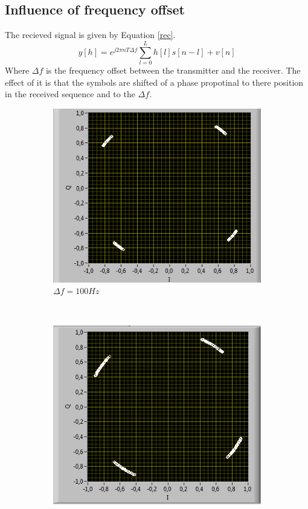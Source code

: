 \documentclass{article}
\begin{document}
	\subsection{Influence of frequency offset}
		The recieved signal is given by Equation \ref{rec}.
		\begin{equation}
			y[h] = e^{j2\pi nT\Delta f} \sum _{l=0}^{L} h[l]s[n-l]+v[n]
			\label{rec}
		\end{equation}
		Where $\Delta f$ is the frequency offset between the transmitter and the receiver. The effect of it is that the symbols are shifted of a phase propotinal to there position in the received sequence and to the $\Delta f$.
		 \begin{figure}[h!]
	            \centering  
	            \begin{subfigure}[b]{0.3 \textwidth}
	                \includegraphics[width=\textwidth]{off100.PNG}
	                \caption{$\Delta f = 100Hz$}\label{fig:2}
	            \end{subfigure}
	            ~	           
	            \begin{subfigure}[b]{0.3 \textwidth}
	           \includegraphics[width=\textwidth]{off201.PNG}

\end{subfigure}
\end{figure}
\end{document}
